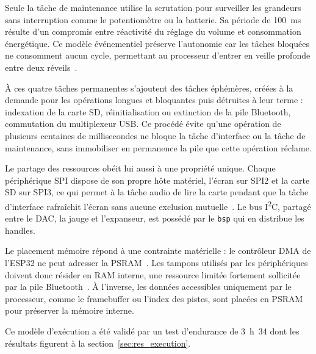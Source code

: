 Seule la tâche de maintenance utilise la scrutation pour surveiller les grandeurs sans interruption comme le potentiomètre ou la batterie. Sa période de 100~ms résulte d'un compromis entre réactivité du réglage du volume et consommation énergétique. Ce modèle événementiel préserve l'autonomie car les tâches bloquées ne consomment aucun cycle, permettant au processeur d'entrer en veille profonde entre deux réveils~\cite{ESP32_IDF_guide}.

À ces quatre tâches permanentes s'ajoutent des tâches éphémères, créées à la demande pour les opérations longues et bloquantes puis détruites à leur terme : indexation de la carte SD, réinitialisation ou extinction de la pile Bluetooth, commutation du multiplexeur USB. Ce procédé évite qu'une opération de plusieurs centaines de millisecondes ne bloque la tâche d'interface ou la tâche de maintenance, sans immobiliser en permanence la pile que cette opération réclame.

Le partage des ressources obéit lui aussi à une propriété unique. Chaque périphérique SPI dispose de son propre hôte matériel, l'écran sur SPI2 et la carte SD sur SPI3, ce qui permet à la tâche audio de lire la carte pendant que la tâche d'interface rafraîchit l'écran sans aucune exclusion mutuelle~\cite{ESP32_Technical_Reference_Manual}. Le bus I\textsuperscript{2}C, partagé entre le DAC, la jauge et l'expanseur, est possédé par le \texttt{bsp} qui en distribue les handles.

Le placement mémoire répond à une contrainte matérielle : le contrôleur DMA de l'ESP32 ne peut adresser la PSRAM~\cite{ESP32_WROVER-E_Datasheet}. Les tampons utilisés par les périphériques doivent donc résider en RAM interne, une ressource limitée fortement sollicitée par la pile Bluetooth~\cite{ESP32_IDF_guide}. À l'inverse, les données accessibles uniquement par le processeur, comme le framebuffer ou l'index des pistes, sont placées en PSRAM pour préserver la mémoire interne.

Ce modèle d'exécution a été validé par un test d'endurance de 3~h~34 dont les résultats figurent à la section~\ref{sec:res_execution}.

